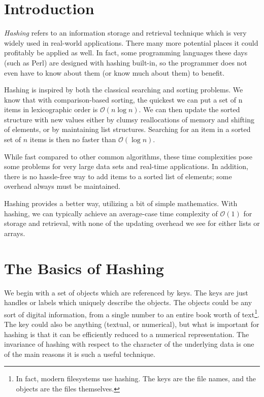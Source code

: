 \documentclass[12pt]{article}
\newcommand{\bigo}{\mathcal{O}}
\begin{document}
\section{Introduction}

\emph{Hashing} refers to an information storage and retrieval technique which is very widely used in real-world applications.  There many more potential places it could profitably be applied as well.  In fact, some programming languages these days (such as Perl) are designed with hashing built-in, so the programmer does not even have to know about them (or know much about them) to benefit.

Hashing is inspired by both the classical searching and sorting problems.  We know that with comparison-based sorting, the quickest we can put a set of n items in lexicographic order is $\bigo(n \log n)$.  We can then update the sorted structure with new values either by clumsy reallocations of memory and shifting of elements, or by maintaining list structures.  Searching for an item in a sorted set of $n$ items is then no faster than $\bigo(\log n)$.

While fast compared to other common algorithms, these time complexities pose some problems for very large data sets and real-time applications.  In addition, there is no hassle-free way to add items to a sorted list of elements; some overhead always must be maintained.

Hashing provides a better way, utilizing a bit of simple mathematics.  With hashing, we can typically achieve an average-case time complexity of $\bigo(1)$ for storage and retrieval, with none of the updating overhead we see for either lists or arrays.  

\section{The Basics of Hashing}

We begin with a set of objects which are referenced by keys. The keys are just handles or labels which uniquely describe the objects.  The objects could be any sort of digital information, from a single number to an entire book worth of text\footnote{In fact, modern filesystems use hashing.  The keys are the file names, and the objects are the files themselves.}.  The key could also be anything (textual, or numerical), but what is important for hashing is that it can be efficiently reduced to a numerical representation.  The invariance of hashing with respect to the character of the underlying data is one of the main reasons it is such a useful technique.
\end{document}
